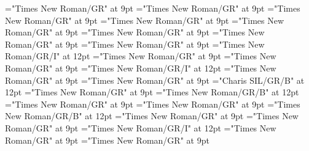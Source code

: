 \documentclass[gps1,twoside]{article}
\begin{document}
\font\spanspanformetymologysubentrysubentriesentrybefore="Times New Roman/GR" at 9pt
\font\spanformetymologysubentrysubentriesentrylastchildafter="Times New Roman/GR" at 9pt
\font\spanspanglossetymologysubentrysubentriesentrybefore="Times New Roman/GR" at 9pt
\font\spanglossetymologysubentrysubentriesentrylastchildafter="Times New Roman/GR" at 9pt
\font\spanspancommentetymologysubentrysubentriesentrybefore="Times New Roman/GR" at 9pt
\font\spancommentetymologysubentrysubentriesentrylastchildafter="Times New Roman/GR" at 9pt
\font\spanspanminimallexreferencessubentrysubentriesentrybefore="Times New Roman/GR" at 9pt
\font\minimallexreferencessubentrysubentriesentryafter="Times New Roman/GR" at 9pt
\font\spanenownertypeabbreviationminimallexreferenceminimallexreferencessubentrysubentriesentry="Times New Roman/GR/I" at 12pt
\font\spanspanownertypeabbreviationminimallexreferenceminimallexreferencessubentrysubentriesentrybefore="Times New Roman/GR" at 9pt
\font\spanownertypeabbreviationminimallexreferenceminimallexreferencessubentrysubentriesentrylastchildafter="Times New Roman/GR" at 9pt
\font\spanownertypeabbreviationminimallexreferenceminimallexreferencessubentrysubentriesentry="Times New Roman/GR/I" at 12pt
\font\configtargetconfigtargetconfigtargetsminimallexreferenceminimallexreferencessubentrysubentriesentrybefore="Times New Roman/GR" at 9pt
\font\configtargetsminimallexreferenceminimallexreferencessubentrysubentriesentryafter="Times New Roman/GR" at 9pt
\font\spanbzhheadwordconfigtargetconfigtargetsminimallexreferenceminimallexreferencessubentrysubentriesentry="Charis SIL/GR/B" at 12pt
\font\spanspanheadwordconfigtargetconfigtargetsminimallexreferenceminimallexreferencessubentrysubentriesentrybefore="Times New Roman/GR" at 9pt
\font\spanheadwordconfigtargetconfigtargetsminimallexreferenceminimallexreferencessubentrysubentriesentry="Times New Roman/GR/B" at 12pt
\font\spanspansensecontentspansensessubentrysubentriesentrybefore="Times New Roman/GR" at 9pt
\font\sensessubentrysubentriesentryafter="Times New Roman/GR" at 9pt
\font\sensenumbersensecontentsensessubentrysubentriesentry="Times New Roman/GR/B" at 12pt
\font\sensenumbersensecontentsensessubentrysubentriesentryafter="Times New Roman/GR" at 9pt
\font\morphosyntaxanalysissharedgrammaticalinfosensessubentrysubentriesentryafter="Times New Roman/GR" at 9pt
\font\morphosyntaxanalysissharedgrammaticalinfosensessubentrysubentriesentry="Times New Roman/GR/I" at 12pt
\font\spanspanpartofspeechmorphosyntaxanalysissharedgrammaticalinfosensessubentrysubentriesentrybefore="Times New Roman/GR" at 9pt
\font\spanpartofspeechmorphosyntaxanalysissharedgrammaticalinfosensessubentrysubentriesentrylastchildafter="Times New Roman/GR" at 9pt
\end{document}
